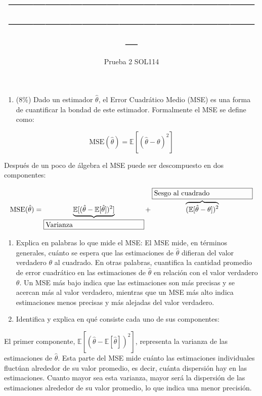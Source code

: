 \documentclass[
  letterpaper,
  DIV=11,
  numbers=noendperiod]{scrartcl}
\title{\_\_\_\_\_\_\_\_\_\_\_\_\_\_\_\_\_\_\_\_\_\_\_\_\_\_\_\_\_\_\_\_\_\_\_\_\_\_\_\_\_}
\author{Prueba 2 SOL114}
\date{}
\providecommand{\tightlist}{%
  \setlength{\itemsep}{0pt}\setlength{\parskip}{0pt}}\usepackage{longtable,booktabs,array}
\begin{document}
\maketitle
\ifdefined\Shaded\renewenvironment{Shaded}{\begin{tcolorbox}[breakable, interior hidden, borderline west={3pt}{0pt}{shadecolor}, enhanced, frame hidden, boxrule=0pt, sharp corners]}{\end{tcolorbox}}\fi

\begin{enumerate}
\def\labelenumi{\arabic{enumi}.}
\tightlist
\item
  (8\%) Dado un estimador \(\hat{\theta}\), el Error Cuadrático Medio
  (MSE) es una forma de cuantificar la bondad de este estimador.
  Formalmente el MSE se define como:
\end{enumerate}

\[\text{MSE}(\hat{\theta}) = \mathbb{E}[(\hat{\theta} - \theta)^2]\]

Después de un poco de álgebra el MSE puede ser descompuesto en dos
componentes:

\[\text{MSE}(\hat{\theta}) = \underbrace{\mathbb{E}[(\hat{\theta} - \mathbb{E}[\hat{\theta}])^2]}_{\framebox[5cm][l]{Varianza}} + \overbrace{(\mathbb{E}[\hat{\theta} - \theta ])^2}^{\framebox[5cm][l]{Sesgo al cuadrado}}\]

\begin{enumerate}
\def\labelenumi{\roman{enumi}.}
\item
  Explica en palabras lo que mide el MSE: El MSE mide, en términos
  generales, cuánto se espera que las estimaciones de \(\hat{\theta}\)
  difieran del valor verdadero \(\theta\) al cuadrado. En otras
  palabras, cuantifica la cantidad promedio de error cuadrático en las
  estimaciones de \(\hat{\theta}\) en relación con el valor verdadero
  \(\theta\). Un MSE más bajo indica que las estimaciones son más
  precisas y se acercan más al valor verdadero, mientras que un MSE más
  alto indica estimaciones menos precisas y más alejadas del valor
  verdadero.
\item
  Identifica y explica en qué consiste cada uno de sus componentes:
\end{enumerate}

El primer componente,
\(\mathbb{E}[(\hat{\theta} - \mathbb{E}[\hat{\theta}])^2]\), representa
la varianza de las estimaciones de \(\hat{\theta}\). Esta parte del MSE
mide cuánto las estimaciones individuales fluctúan alrededor de su valor
promedio, es decir, cuánta dispersión hay en las estimaciones. Cuanto
mayor sea esta varianza, mayor será la dispersión de las estimaciones
alrededor de su valor promedio, lo que indica una menor precisión.
\end{document}
